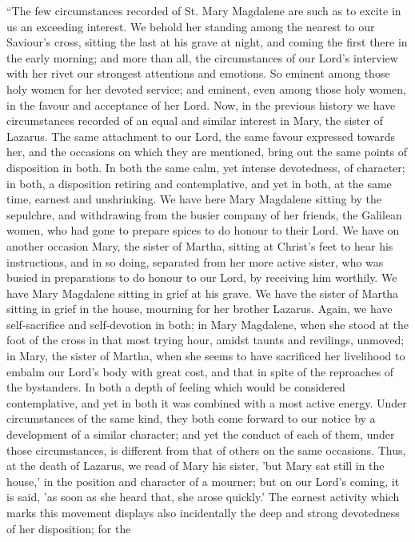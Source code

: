 ``The few circumstances recorded of
St. Mary Magdalene are such as to excite in us an exceeding interest. We
behold her standing among the nearest to our Saviour's cross, sitting
the last at his grave at night, and coming the first there in the early
morning; and more than all, the circumstances of our Lord's interview
with her rivet our strongest attentions and emotions. So eminent among
those holy women for her devoted service; and eminent, even among those
holy women, in the favour and acceptance of her Lord. Now, in the
previous history we have circumstances recorded of an equal and similar
interest in Mary, the sister of Lazarus. The same attachment to our
Lord, the same favour expressed towards her, and the occasions on which
they are mentioned, bring out the same points of disposition in both. In
both the same calm, yet intense devotedness, of character; in both, a
disposition retiring and contemplative, and yet in both, at the same
time, earnest and unshrinking. We have here Mary Magdalene sitting by
the sepulchre, and withdrawing from the busier company of her friends,
the Galilean women, who had gone to prepare spices to do honour to their
Lord. We have on another occasion Mary, the sister of Martha, sitting at
Christ's feet to hear his instructions, and in so doing, separated from
her more active sister, who was busied in preparations to do honour to
our Lord, by receiving him worthily. We have Mary Magdalene sitting in
grief at his grave. We have the sister of Martha sitting in grief in the
house, mourning for her brother Lazarus. Again, we have self-sacrifice
and self-devotion in both; in Mary Magdalene, when she stood at the foot
of the cross in that most trying hour, amidst taunts and revilings,
unmoved; in Mary, the sister of Martha, when she seems to have
sacrificed her livelihood to embalm our Lord's body with great cost, and
that in spite of the reproaches of the bystanders. In both a depth of
feeling which would be considered contemplative, and yet in both it was
combined with a most active energy. Under circumstances of the same
kind, they both come forward to our notice by a development of a similar
character; and yet the conduct of each of them, under those
circumstances, is different from that of others on the same occasions.
Thus, at the death of Lazarus, we read of Mary his sister, 'but Mary sat
still in the house,' in the position and character of a mourner; but on
our Lord's coming, it is said, 'as soon as she heard that, she arose
quickly.' The earnest activity which marks this movement displays also
incidentally the deep and strong devotedness of her disposition; for the

